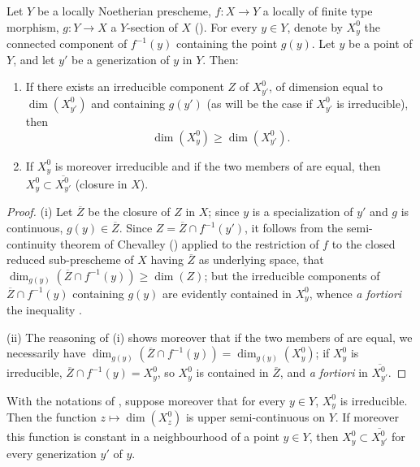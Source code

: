 \begin{proposition}[15.6.1]
\label{IV.15.6.1}
Let $Y$ be a locally Noetherian prescheme, $f:X\to Y$ a locally of finite type morphism, $g:Y\to X$ a $Y$-section of $X$ ().
For every $y\in Y$, denote by $X_y^0$ the connected component of $f^{-1}(y)$ containing the point $g(y)$.
Let $y$ be a point of $Y$, and let $y'$ be a generization of $y$ in $Y$.
Then:
\begin{enumerate}[label=(\roman*)]
  \item If there exists an irreducible component $Z$ of $X_{y'}^0$, of dimension equal to $\dim(X_{y'}^0)$ and containing $g(y')$ (as will be the case if $X_{y'}^0$ is irreducible), then
\begin{equation}
\tag{15.6.1.1}
\label{IV.15.6.1.1}
  \dim(X_y^0) \geq \dim(X_{y'}^0).
\end{equation}
  \item If $X_y^0$ is moreover irreducible and if the two members of  are equal, then $X_y^0\subset\overline{X_{y'}^0}$ (closure in $X$).
\end{enumerate}
\end{proposition}

\begin{proof}
(i)
Let $\overline{Z}$ be the closure of $Z$ in $X$; since $y$ is a specialization of $y'$ and $g$ is continuous, $g(y)\in\overline{Z}$.
Since $Z=\overline{Z}\cap f^{-1}(y')$, it follows from the semi-continuity theorem of Chevalley () applied to the restriction of $f$ to the closed reduced sub-prescheme of $X$ having $\overline{Z}$ as underlying space, that $\dim_{g(y)}(\overline{Z}\cap f^{-1}(y))\geq\dim(Z)$; but the irreducible components of $\overline{Z}\cap f^{-1}(y)$ containing $g(y)$ are evidently contained in $X_y^0$, whence \emph{a fortiori} the inequality .

(ii)
The reasoning of (i) shows moreover that if the two members of  are equal, we necessarily have $\dim_{g(y)}(\overline{Z}\cap f^{-1}(y))=\dim_{g(y)}(X_y^0)$; if $X_y^0$ is irreducible, $\overline{Z}\cap f^{-1}(y)=X_y^0$, so $X_y^0$ is contained in $\overline{Z}$, and \emph{a fortiori} in $\overline{X_{y'}^0}$.
\end{proof}

\begin{corollary}[15.6.2]
\label{IV.15.6.2}
With the notations of , suppose moreover that for every $y\in Y$, $X_y^0$ is irreducible.
Then the function $z\mapsto\dim(X_z^0)$ is upper semi-continuous on $Y$.
If moreover this function is constant in a neighbourhood of a point $y\in Y$, then $X_y^0\subset\overline{X_{y'}^0}$ for every generization $y'$ of $y$.
\end{corollary}

